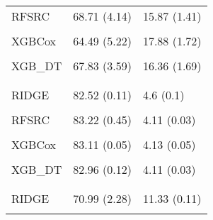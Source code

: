 \begin{longtable}[t]{lll}
\hspace{1em}RFSRC & 68.71 (4.14) & 15.87 (1.41)\\
\hspace{1em}\cellcolor{gray!10}{RFSRC\_DT} & \cellcolor{gray!10}{66.3 (4)} & \cellcolor{gray!10}{16.65 (1.77)}\\
\hspace{1em}XGBCox & 64.49 (5.22) & 17.88 (1.72)\\
\hspace{1em}\cellcolor{gray!10}{XGB\_PEM} & \cellcolor{gray!10}{68.3 (4.71)} & \cellcolor{gray!10}{16.11 (1.57)}\\
\hspace{1em}XGB\_DT & 67.83 (3.59) & 16.36 (1.69)\\
\addlinespace[0.3em]
\multicolumn{3}{l}{\textbf{nafld1}}\\
\hspace{1em}\cellcolor{gray!10}{KM} & \cellcolor{gray!10}{50 (0)} & \cellcolor{gray!10}{5.23 (0.08)}\\
\hspace{1em}RIDGE & 82.52 (0.11) & 4.6 (0.1)\\
\hspace{1em}\cellcolor{gray!10}{GLMN} & \cellcolor{gray!10}{82.58 (0.08)} & \cellcolor{gray!10}{4.59 (0.15)}\\
\hspace{1em}RFSRC & 83.22 (0.45) & 4.11 (0.03)\\
\hspace{1em}\cellcolor{gray!10}{RFSRC\_DT} & \cellcolor{gray!10}{82.96 (0.15)} & \cellcolor{gray!10}{4.21 (0.06)}\\
\hspace{1em}XGBCox & 83.11 (0.05) & 4.13 (0.05)\\
\hspace{1em}\cellcolor{gray!10}{XGB\_PEM} & \cellcolor{gray!10}{82.95 (0.14)} & \cellcolor{gray!10}{4.14 (0.04)}\\
\hspace{1em}XGB\_DT & 82.96 (0.12) & 4.11 (0.03)\\
\addlinespace[0.3em]
\multicolumn{3}{l}{\textbf{nwtco}}\\
\hspace{1em}\cellcolor{gray!10}{KM} & \cellcolor{gray!10}{50 (0)} & \cellcolor{gray!10}{11.49 (0.08)}\\
\hspace{1em}RIDGE & 70.99 (2.28) & 11.33 (0.11)\\
\hspace{1em}\cellcolor{gray!10}{GLMN} & \cellcolor{gray!10}{59.39 (7.5)} & \cellcolor{gray!10}{11.35 (0.12)}\\

\end{longtable}
